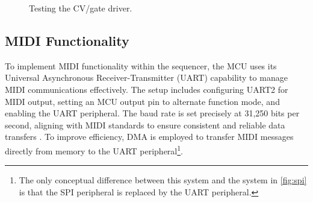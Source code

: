 \documentclass[12pt]{article}
\numberwithin{subsubsubsection}{subsubsection}
\begin{document}
\begin{figure}[H]
    \centering
    \caption{Testing the CV/gate driver.}
    \label{fig:CV_test}
\end{figure}

\subsection{MIDI Functionality}

To implement MIDI functionality within the sequencer, the MCU uses its Universal Asynchronous Receiver-Transmitter (UART) capability to manage MIDI communications effectively. The setup includes configuring UART2 for MIDI output, setting an MCU output pin to alternate function mode, and enabling the UART peripheral. The baud rate is set precisely at 31,250 bits per second, aligning with MIDI standards to ensure consistent and reliable data transfers \cite{MIDI_protocol}. To improve efficiency, DMA is employed to transfer MIDI messages directly from memory to the UART peripheral\footnote{The only conceptual difference between this system and the system in \autoref{fig:spi} is that the SPI peripheral is replaced by the UART peripheral.}.
\end{document}
